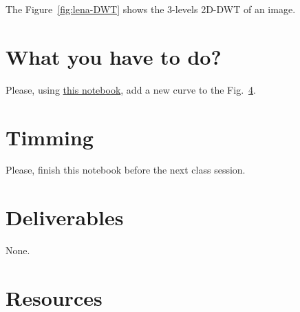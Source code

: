 The Figure~\ref{fig:lena-DWT} shows the $3$-levels 2D-DWT of an image.

\section{What you have to do?}
  
Please, using \href{}{this notebook}, add a new curve to the Fig.~\ref{}.

\section{Timming}

Please, finish this notebook before the next class session.

\section{Deliverables}

None.

\section{Resources}


